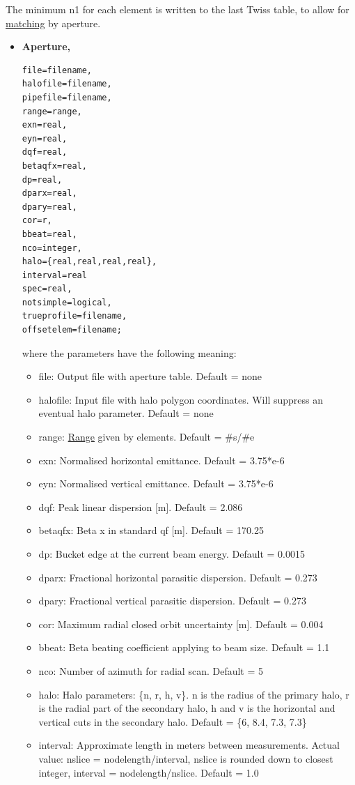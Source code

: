 The minimum n1 for each element is written to the last Twiss table, to allow for \href{../match/match.html}{matching} by aperture.  
\begin{itemize}
	\item \textbf{Aperture,}
	
\begin{verbatim}
file=filename,
halofile=filename,
pipefile=filename,
range=range,
exn=real,
eyn=real,
dqf=real,
betaqfx=real,
dp=real,
dparx=real,
dpary=real,
cor=r,
bbeat=real,
nco=integer,
halo={real,real,real,real},
interval=real
spec=real,
notsimple=logical,
trueprofile=filename,
offsetelem=filename;
\end{verbatim} 

where the parameters have the following meaning: 
\begin{itemize}
	\item file: Output file with aperture table. Default = none 
	\item halofile: Input file with halo polygon coordinates. Will suppress  an eventual halo parameter. Default = none 
	\item range: \href{../Introduction/ranges.html}{Range} given by  elements. Default = \#s/\#e 
	\item exn: Normalised horizontal emittance. Default = 3.75*e-6 
	\item eyn: Normalised vertical emittance. Default = 3.75*e-6 
	\item dqf: Peak linear dispersion [m]. Default = 2.086 
	\item betaqfx: Beta x in standard qf [m]. Default = 170.25 
	\item dp: Bucket edge at the current beam energy. Default = 0.0015 
	\item dparx: Fractional horizontal parasitic dispersion. Default = 0.273 
	\item dpary: Fractional vertical parasitic dispersion. Default = 0.273 
	\item cor: Maximum radial closed orbit uncertainty [m]. Default = 0.004 
	\item bbeat: Beta beating coefficient applying to beam size. Default = 1.1 
	\item nco: Number of azimuth for radial scan. Default = 5 
	\item halo: Halo parameters: \{n, r, h, v\}. n is the radius of the primary halo,  r is the radial part of the secondary halo, h and v is the horizontal and  vertical cuts in the secondary halo. Default = \{6, 8.4, 7.3, 7.3\} 
	\item interval: Approximate length in meters between measurements. Actual value:  nslice = nodelength/interval, nslice is rounded down to closest integer,  interval = nodelength/nslice. Default = 1.0 

\end{itemize}
\end{itemize}
